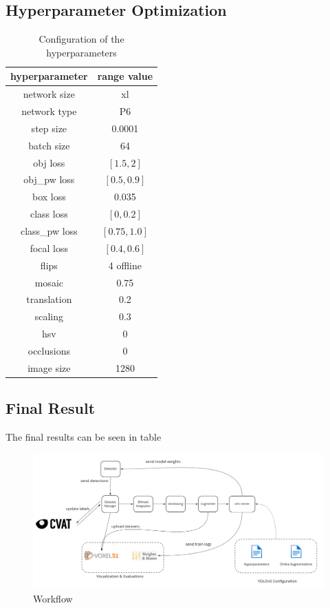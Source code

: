 \subsection*{Hyperparameter Optimization}
\begin{table}
  \centering
    \begin{tabular}{ ||c|c||}
    \hline
    hyperparameter  & range value\\ [0.5ex]
    \hline\hline
    network size & xl \\
    network type & P6 \\
    step size  & 0.0001 \\
    batch size & 64 \\
    obj loss & $[1.5, 2]$ \\
    obj\_pw loss & $[0.5, 0.9]$ \\
    box loss & 0.035  \\
    class loss & $[0, 0.2]$ \\
    class\_pw loss & $[0.75, 1.0]$ \\
    focal loss & $[0.4, 0.6]$ \\
    flips & 4 offline \\
    mosaic & 0.75 \\
    translation &  0.2 \\
    scaling & 0.3 \\
    hsv & 0 \\
    occlusions & 0 \\
    image size & 1280 \\
    \hline
    \end{tabular}
  \caption{Configuration of the hyperparameters}
  \label{impl:hyp_table}
\end{table}

\subsection*{Final Result}
The final results can be seen in table 

\begin{figure}[!h]
  \centering
  \captionsetup{justification=centering,margin=2cm}
  \includegraphics[width=\columnwidth]{images/implementation/results/workflow}
  \caption{Workflow}
  \label{impl:workflow}
\end{figure}


